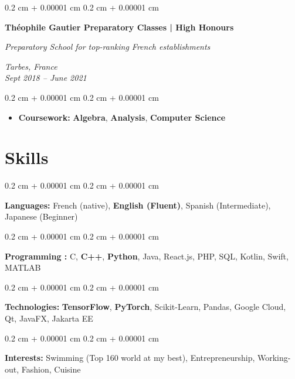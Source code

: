 \documentclass[10pt, letterpaper]{article}
\newenvironment{highlights}{
    \begin{itemize}[
        topsep=0.10 cm,
        parsep=0.10 cm,
        partopsep=0pt,
        itemsep=0pt,
        leftmargin=0.4 cm + 10pt
    ]
}{
    \end{itemize}
} %
\newenvironment{onecolentry}{
    \begin{adjustwidth}{
        0.2 cm + 0.00001 cm
    }{
        0.2 cm + 0.00001 cm
    }
}{
    \end{adjustwidth}
} %
\newenvironment{twocolentry}[2][]{
    \onecolentry
    \def\secondColumn{#2}
    \setcolumnwidth{\fill, 4.5 cm}
    \begin{paracol}{2}
}{
    \switchcolumn \raggedleft \secondColumn
    \end{paracol}
    \endonecolentry
} %
\begin{document}
        \begin{twocolentry}{
        \textit{Tarbes, France}\\
        \textit{Sept 2018 – June 2021}}
            \textbf{\textcolor{clearblue}{Théophile Gautier Preparatory Classes} | \textbf{High Honours}}

            \textit{Preparatory School for top-ranking French establishments}
        \end{twocolentry}

        \vspace{0.10 cm}
        \begin{onecolentry}
            \begin{highlights}
                \item \textbf{Coursework:} \textbf{Algebra}, \textbf{Analysis}, \textbf{Computer Science}
            \end{highlights}
        \end{onecolentry}

    \section{Skills}

        \begin{onecolentry}
            \textbf{Languages:} French (native), \textbf{English (Fluent)}, Spanish (Intermediate), Japanese (Beginner)  
        \end{onecolentry}

        \vspace{0.2 cm}
        
        \begin{onecolentry}
            \textbf{Programming :} C, \textbf{C++}, \textbf{Python}, Java, React.js, PHP, SQL, Kotlin, Swift, MATLAB
        \end{onecolentry}

        \vspace{0.2 cm}

        \begin{onecolentry}
            \textbf{Technologies:} \textbf{TensorFlow},  \textbf{PyTorch}, Scikit-Learn, Pandas, Google Cloud, Qt, JavaFX, Jakarta EE
        \end{onecolentry}
        \vspace{0.2 cm}
        \begin{onecolentry}
            \textbf{Interests:} Swimming (Top 160 world at my best), Entrepreneurship, Working-out, Fashion, Cuisine
        \end{onecolentry}
\end{document}
